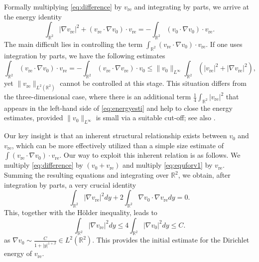\documentclass[12pt]{amsart}
\numberwithin{equation}{section}              %
\theoremstyle{remark}
\begin{document}
	Formally multiplying \eqref{eq:difference} by $v_{\text{re}}$ and integrating by parts, we arrive at the energy identity
	\begin{equation}\label{eq:energyesti}
		\int_{\mathbb{R}^2} |\nabla v_{\text{re}}|^2 + ( v_{\text{re}}\cdot \nabla  v_0)\cdot v_{\text{re}} = 	-\int_{\mathbb{R}^2} ( v_0\cdot\nabla  v_0)\cdot  	v_{\text{re}}.
	\end{equation}
	The main difficult lies in controlling the term $\int_{\mathbb{R}^2}  ( v_{\text{re}}\cdot \nabla  v_0)\cdot v_{\text{re}} $. 
	If one uses integration by parts, we have the following estimates
	\begin{equation*}
		\int_{\mathbb{R}^2}  ( v_{\text{re}}\cdot \nabla  v_0)\cdot v_{\text{re}}  = - \int_{\mathbb{R}^2}  ( v_{\text{re}}\cdot \nabla  v_{\text{re}})\cdot  v_0 \leq \| v_0\|_{L^\infty}\int_{\mathbb{R}^2}  ( |v_{\text{re}}|^2+ | \nabla v_{\text{re}}|^2),
	\end{equation*}
	yet $\|v_{\text{re}}\|_{L^2(\mathbb{R}^2)}$ cannot be controlled at this stage. This situation differs from the three-dimensional case,  where there is an additional term $\frac{1}{4}\int_{\mathbb{R}^2} |v_{\text{re}}|^2$ that appears in the left-hand side of \eqref{eq:energyesti} and
	help to close the energy estimates, provided $\|v_0\|_{L^\infty}$ is small via a suitable cut-off; see also \cite{Tsai17, Bradshaw17}.
	
	Our key insight is that an inherent structural relationship exists between $v_0$ and $v_{\text{re}}$, which can be more effectively utilized than a simple size estimate of $\int (v_{\text{re}} \cdot \nabla v_0) \cdot v_{\text{re}}$. 
	Our way to exploit this inherent relation is as follows.
	We	multiply \eqref{eq:difference} by $( v_0+v_{\text{re}})$ and multiply \eqref{eq:equforv1} by $v_{\text{re}}$. Summing the resulting equations and integrating over $\mathbb{R}^2$, we obtain, after integration by parts,  a very crucial identity
	\begin{equation}\label{eq:crucialidentity}
		\int_{\mathbb{R}^2} |\nabla v_{\text{re}}|^2 dy + 2\int_{\mathbb{R}^2} \nabla  v_0\cdot \nabla v_{\text{re}} dy =0.
	\end{equation}
	This, together with the H\"older inequality, leads to 
	\begin{equation}\label{eq:dirichletener}
		\int_{\mathbb{R}^2} |\nabla v_{\text{re}}|^2 dy \leq  4\int_{\mathbb{R}^2}|\nabla  v_0|^2 dy\leq C.
	\end{equation}
	as $\nabla  v_0\sim \frac{C}{1+|y|^{1+\beta}}\in L^2(\mathbb{R}^2)$.
	This provides the initial estimate for the Dirichlet energy of $v_{\text{re}}$.
    
\end{document}
